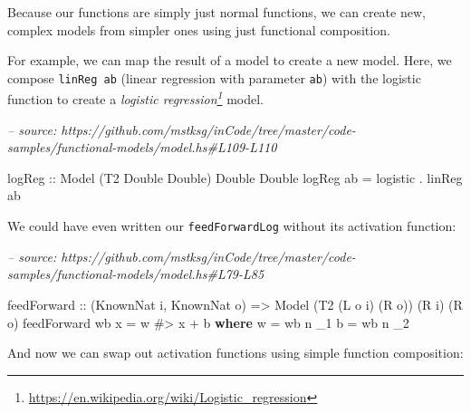 \documentclass[]{article}
\newenvironment{Shaded}{}{}
\newcommand{\CommentTok}[1]{\textcolor[rgb]{0.38,0.63,0.69}{\textit{#1}}}
\newcommand{\DataTypeTok}[1]{\textcolor[rgb]{0.56,0.13,0.00}{#1}}
\newcommand{\FunctionTok}[1]{\textcolor[rgb]{0.02,0.16,0.49}{#1}}
\newcommand{\KeywordTok}[1]{\textcolor[rgb]{0.00,0.44,0.13}{\textbf{#1}}}
\newcommand{\NormalTok}[1]{#1}
\newcommand{\OtherTok}[1]{\textcolor[rgb]{0.00,0.44,0.13}{#1}}
\renewcommand{\href}[2]{#2\footnote{\url{#1}}}
\begin{document}
Because our functions are simply just normal functions, we can create new,
complex models from simpler ones using just functional composition.

For example, we can map the result of a model to create a new model. Here, we
compose \texttt{linReg\ ab} (linear regression with parameter \texttt{ab}) with
the logistic function to create a
\emph{\href{https://en.wikipedia.org/wiki/Logistic_regression}{logistic
regression}} model.

\begin{Shaded}
\begin{Highlighting}[]
\CommentTok{-- source: https://github.com/mstksg/inCode/tree/master/code-samples/functional-models/model.hs#L109-L110}

\OtherTok{logReg ::} \DataTypeTok{Model}\NormalTok{ (}\DataTypeTok{T2} \DataTypeTok{Double} \DataTypeTok{Double}\NormalTok{) }\DataTypeTok{Double} \DataTypeTok{Double}
\NormalTok{logReg ab }\FunctionTok{=}\NormalTok{ logistic }\FunctionTok{.}\NormalTok{ linReg ab}
\end{Highlighting}
\end{Shaded}

We could have even written our \texttt{feedForwardLog} without its activation
function:

\begin{Shaded}
\begin{Highlighting}[]
\CommentTok{-- source: https://github.com/mstksg/inCode/tree/master/code-samples/functional-models/model.hs#L79-L85}

\NormalTok{feedForward}
\OtherTok{    ::}\NormalTok{ (}\DataTypeTok{KnownNat}\NormalTok{ i, }\DataTypeTok{KnownNat}\NormalTok{ o)}
    \OtherTok{=>} \DataTypeTok{Model}\NormalTok{ (}\DataTypeTok{T2}\NormalTok{ (}\DataTypeTok{L}\NormalTok{ o i) (}\DataTypeTok{R}\NormalTok{ o)) (}\DataTypeTok{R}\NormalTok{ i) (}\DataTypeTok{R}\NormalTok{ o)}
\NormalTok{feedForward wb x }\FunctionTok{=}\NormalTok{ w }\FunctionTok{#>}\NormalTok{ x }\FunctionTok{+}\NormalTok{ b}
  \KeywordTok{where}
\NormalTok{    w }\FunctionTok{=}\NormalTok{ wb }\FunctionTok{^^.}\NormalTok{ _1}
\NormalTok{    b }\FunctionTok{=}\NormalTok{ wb }\FunctionTok{^^.}\NormalTok{ _2}
\end{Highlighting}
\end{Shaded}

And now we can swap out activation functions using simple function composition:
\end{document}
